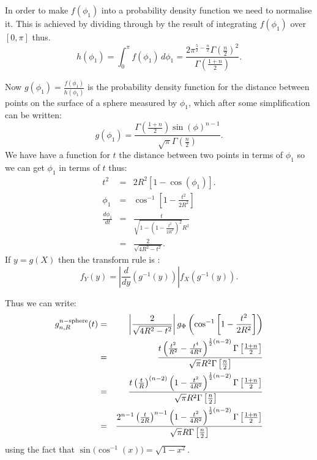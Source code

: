 In order to make $f(\phi_1)$ into a probability density function we
need to normalise it. This is achieved by dividing through by the
result of integrating $f(\phi_1)$ over $[0, \pi]$ thus.
 \begin{equation}      
 h(\phi_1) = \int_0^{\pi}  f(\phi_1) \, d\phi_1
           =  \frac{2 \pi ^{\frac{5}{2}-\frac{n}{2}} 
            \Gamma\left(\frac{n}{2}\right)^2}{\Gamma\left(\frac{1+n}{2}\right)}.
\end{equation}


Now $g(\phi_1) =\frac{f(\phi_1)}{ h(\phi_1)}$ is the  probability
density function for the distance between points on the surface of a
sphere measured by $\phi_1$, which after some simplification can be
written: 
\begin{equation}  
 g(\phi_1) = \frac{\Gamma\left(\frac{1+n}{2}\right) \sin(\phi )^{n - 1}}{\sqrt{\pi } \Gamma\left(\frac{n}{2}\right)}.
\end{equation} 
We have have a function for $t$ the distance between two points in
terms of $\phi_1$ so we can get  $\phi_1$ in terms of $t$ thus: 
\begin{eqnarray}
  t^2 & = & 2 R^2 \left[ 1 - \cos(\phi_1) \right].\\
\phi_1& =  & \cos^{-1} \left[1-\frac{t^2}{2 R^2}\right]\\ 
   \frac {d \phi_1}{dt} & = &\frac{t}{\sqrt{1-\left(1-\frac{t^2}{2 R^2}\right)^2} R^2} \\
   & = &\frac{2}{\sqrt{4 R^2 -t^2 }}.
\end{eqnarray}
If $y = g(X)$ then the transform rule  is :  
\[ f_Y(y) = \left| \frac{d}{dy} \left( g^{-1}(y) \right) \right|
                f_X\left( g^{-1}(y) \right).
\]

Thus we can write:
\begin{eqnarray}
  g^{n-{\rm sphere}}_{n,R}(t)
    & = & \left|\frac{2}{\sqrt{4 R^2 -t^2 }} \right|
             g_{\Phi}\left( \cos^{-1} \left[1-\frac{t^2}{2  R^2}\right]\right) \nonumber \\
    & = & \frac{t \left(\frac{t^2}{R^2} -\frac{t^4}{4 R^4}\right)^{\frac{1}{2} (n-2)}
             \Gamma\left[\frac{1+n}{2}\right]}{\sqrt{\pi } R^2 \Gamma\left[\frac{n}{2}\right]}  \nonumber \\
    & = & \frac{t \left(\frac{t}{R} \right)^{(n-2)}
             \left(1 -\frac{t^2}{4 R^2}\right)^{\frac{1}{2} (n-2)}
             \Gamma\left[\frac{1+n}{2}\right]}{\sqrt{\pi } R^2 \Gamma\left[\frac{n}{2}\right]}  \nonumber \\
    & = & \frac{2^{n-1} \left(\frac{t}{2R} \right)^{n-1}
             \left(1 -\frac{t^2}{4 R^2}\right)^{\frac{1}{2} (n-2)}
             \Gamma\left[\frac{1+n}{2}\right]}{\sqrt{\pi } R \Gamma\left[\frac{n}{2}\right]}  
\end{eqnarray}
using the fact that $\sin\big( \cos^{-1}(x) \big) = \sqrt{1 - x^2}$.

